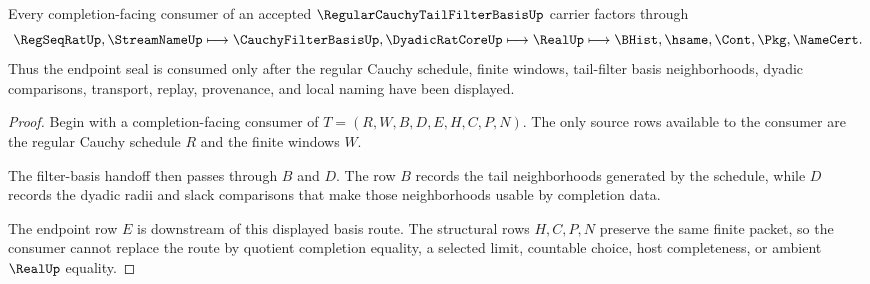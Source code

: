 \begin{theorem}
\label{thm:regular-cauchy-tail-filter-basis-endpoint-handoff}
Every completion-facing consumer of an accepted $\RegularCauchyTailFilterBasisUp$ carrier factors through
$$
\RegSeqRatUp,\StreamNameUp \longmapsto \CauchyFilterBasisUp,\DyadicRatCoreUp \longmapsto \RealUp \longmapsto \BHist,\hsame,\Cont,\Pkg,\NameCert .
$$
Thus the endpoint seal is consumed only after the regular Cauchy schedule, finite windows, tail-filter basis neighborhoods, dyadic comparisons, transport, replay, provenance, and local naming have been displayed.
\end{theorem}
\begin{proof}
Begin with a completion-facing consumer of $T=(R,W,B,D,E,H,C,P,N)$. The only source rows available to the consumer are the regular Cauchy schedule $R$ and the finite windows $W$.

The filter-basis handoff then passes through $B$ and $D$. The row $B$ records the tail neighborhoods generated by the schedule, while $D$ records the dyadic radii and slack comparisons that make those neighborhoods usable by completion data.

The endpoint row $E$ is downstream of this displayed basis route. The structural rows $H,C,P,N$ preserve the same finite packet, so the consumer cannot replace the route by quotient completion equality, a selected limit, countable choice, host completeness, or ambient $\RealUp$ equality.
\end{proof}




